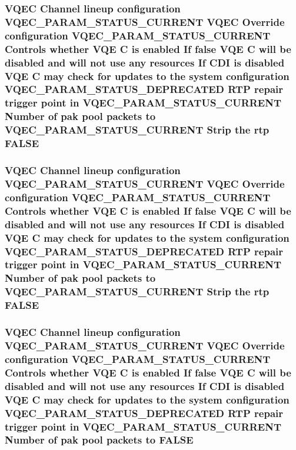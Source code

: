 \subsubsection{\setlength{\rightskip}{0pt plus 5cm}VQEC Channel lineup configuration VQEC\_\-PARAM\_\-STATUS\_\-CURRENT VQEC Override configuration VQEC\_\-PARAM\_\-STATUS\_\-CURRENT Controls whether VQE \bf{C} is enabled If false VQE \bf{C} will be disabled and will not use any resources If CDI is disabled VQE \bf{C} may check for updates \bf{to} the system configuration VQEC\_\-PARAM\_\-STATUS\_\-DEPRECATED RTP repair trigger point in VQEC\_\-PARAM\_\-STATUS\_\-CURRENT Number of pak pool packets \bf{to} VQEC\_\-PARAM\_\-STATUS\_\-CURRENT Strip the rtp \bf{FALSE}}\label{vqec__cfg__settings_8h_947386a257303125912a5c38c9e2f771}


\subsubsection{\setlength{\rightskip}{0pt plus 5cm}VQEC Channel lineup configuration VQEC\_\-PARAM\_\-STATUS\_\-CURRENT VQEC Override configuration VQEC\_\-PARAM\_\-STATUS\_\-CURRENT Controls whether VQE \bf{C} is enabled If false VQE \bf{C} will be disabled and will not use any resources If CDI is disabled VQE \bf{C} may check for updates \bf{to} the system configuration VQEC\_\-PARAM\_\-STATUS\_\-DEPRECATED RTP repair trigger point in VQEC\_\-PARAM\_\-STATUS\_\-CURRENT Number of pak pool packets \bf{to} VQEC\_\-PARAM\_\-STATUS\_\-CURRENT Strip the rtp \bf{FALSE}}\label{vqec__cfg__settings_8h_947386a257303125912a5c38c9e2f771}


\subsubsection{\setlength{\rightskip}{0pt plus 5cm}VQEC Channel lineup configuration VQEC\_\-PARAM\_\-STATUS\_\-CURRENT VQEC Override configuration VQEC\_\-PARAM\_\-STATUS\_\-CURRENT Controls whether VQE \bf{C} is enabled If false VQE \bf{C} will be disabled and will not use any resources If CDI is disabled VQE \bf{C} may check for updates \bf{to} the system configuration VQEC\_\-PARAM\_\-STATUS\_\-DEPRECATED RTP repair trigger point in VQEC\_\-PARAM\_\-STATUS\_\-CURRENT Number of pak pool packets \bf{to} \bf{FALSE}}\label{vqec__cfg__settings_8h_c10468e2a10eddf6c7dcc682a180fdf9}


